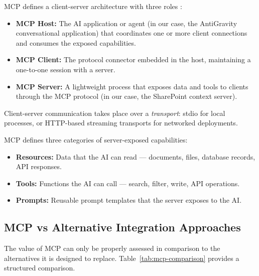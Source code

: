 MCP defines a client-server architecture with three roles \citep{MCPSpec2025}:

\begin{itemize}
  \item \textbf{MCP Host:} The AI application or agent (in our case, the AntiGravity conversational application) that coordinates one or more client connections and consumes the exposed capabilities.
  \item \textbf{MCP Client:} The protocol connector embedded in the host, maintaining a one-to-one session with a server.
  \item \textbf{MCP Server:} A lightweight process that exposes data and tools to clients through the MCP protocol (in our case, the SharePoint context server).
\end{itemize}

Client-server communication takes place over a \textit{transport}: stdio for local processes, or HTTP-based streaming transports for networked deployments.

MCP defines three categories of server-exposed capabilities:

\begin{itemize}
  \item \textbf{Resources:} Data that the AI can read — documents, files, database records, API responses.
  \item \textbf{Tools:} Functions the AI can call — search, filter, write, API operations.
  \item \textbf{Prompts:} Reusable prompt templates that the server exposes to the AI.
\end{itemize}

\subsection{MCP vs Alternative Integration Approaches}

The value of MCP can only be properly assessed in comparison to the alternatives it is designed to replace. Table~\ref{tab:mcp-comparison} provides a structured comparison.

